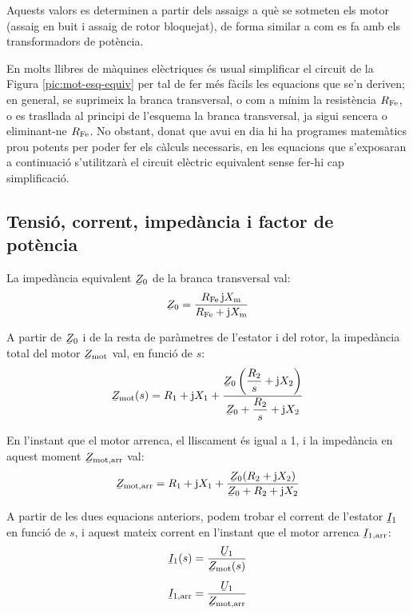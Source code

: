 Aquests valors es determinen a partir dels assaigs a què se sotmeten els motor (assaig en buit i assaig de rotor bloquejat), de forma similar a com es fa amb els transformadors de potència.

En molts llibres de màquines elèctriques és usual simplificar el circuit de la Figura  \vref{pic:mot-esq-equiv} per tal de fer més fàcils les equacions que se'n deriven; en general, se suprimeix la branca transversal, o com a mínim la resistència $R_\mathrm{Fe}$, o es trasllada al principi de l'esquema la branca transversal, ja sigui sencera o eliminant-ne  $R_\mathrm{Fe}$. No obstant, donat que avui en dia hi ha programes matemàtics prou potents per poder fer els càlculs necessaris, en les equacions que s'exposaran a continuació s'utilitzarà el circuit elèctric equivalent sense fer-hi cap simplificació.

\subsection{Tensió, corrent, impedància i factor de potència}\label{sec:mot-u-c-i}

La impedància equivalent $\cmplx{Z}_0$ de la branca transversal val:
\begin{equation}\label{eq:mot-Z0}
    \cmplx{Z}_0 = \frac{R\ped{Fe} \, \ju X\ped{m}}{ R\ped{Fe} + \ju X\ped{m}}
\end{equation}

A partir de $\cmplx{Z}_0$ i de la resta de paràmetres de l'estator i del rotor, la impedància total del motor $\cmplx{Z}\ped{mot}$ val,  en funció de $s$:
\begin{equation}\label{eq:mot-Zmot}\index{motors d'inducció!impedància}
    \cmplx{Z}\ped{mot}(s) = R_1 + \ju X_1 + \frac{\cmplx{Z}_0 \left( \dfrac{R_2}{s} + \ju X_2\right)}{\cmplx{Z}_0 +  \dfrac{R_2}{s} + \ju X_2}
\end{equation}

En l'instant que el motor arrenca, el lliscament és igual a 1, i la impedància en aquest moment $\cmplx{Z}\ped{mot,arr}$ val:
\begin{equation}\label{eq:z-mot-arr}
    \cmplx{Z}\ped{mot,arr} = R_1 + \ju X_1 + \frac{\cmplx{Z}_0 ( R_2 + \ju X_2)}{\cmplx{Z}_0 +  R_2 + \ju X_2}
\end{equation}

A partir de les dues equacions anteriors, podem trobar el corrent de l'estator  $\cmplx{I}_1$ en funció de $s$, i aquest mateix corrent en l'instant que el motor arrenca $\cmplx{I}\ped{1,arr}$:
\begin{subequations}\index{motors d'inducció!corrent d'arrencada}\index{motors d'inducció!corrent}
\begin{align}
    \cmplx{I}_1(s) &= \frac{\cmplx{U}_1}{\cmplx{Z}\ped{mot}(s)}\label{eq:I1-mot} \\[1ex]
    \cmplx{I}\ped{1,arr} &= \frac{\cmplx{U}_1}{\cmplx{Z}\ped{mot,arr}}\label{eq:I1-mot-arr}
\end{align}
\end{subequations}

